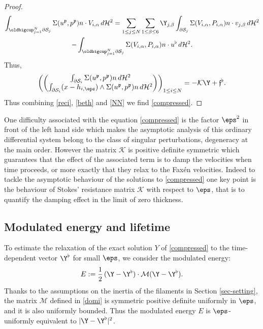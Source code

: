 \begin{proof}
\begin{multline*}
\int_{\oldbigcup_{j=1}^N \partial \mathcal S_j }
\Sigma(u^\mathfrak{p}, p^\mathfrak{p}) n \cdot V_{i,\alpha} \, d\mathcal{H}^2=
\sum_{1 \leq j \leq N} \sum_{1\leq \beta \leq 6} \Y_{j,\beta } \int_{\partial \mathcal S_j }
\Sigma(V_{i,\alpha}, P_{i,\alpha}) n \cdot v_{j,\beta} \, d\mathcal{H}^2
\\ 
-\int_{\oldbigcup_{j=1}^N \partial \mathcal S_j } \Sigma(V_{i,\alpha}, P_{i,\alpha}) n \cdot u^\flat \, d\mathcal{H}^2.
\end{multline*}
Thus,
\begin{equation}
\label{reci}
\biggl(\begin{pmatrix}
\int_{\partial \mathcal S_i } \Sigma(u^\mathfrak{p}, p^\mathfrak{p}) n \, d\mathcal{H}^2 \\
\int_{\partial \mathcal S_i} (x - h_{i,\eps}) \wedge \Sigma(u^\mathfrak{p}, p^\mathfrak{p}) n \, d\mathcal{H}^2
\end{pmatrix}\biggr)_{1 \leq i \leq N}
=
- \mathcal K \Y
+ \mathfrak{f}^\flat.
\end{equation}
Thus combining \eqref{reci}, \eqref{beth} and \eqref{NN}
we find \eqref{compressed}.
\end{proof}

One difficulty associated with the equation \eqref{compressed}
is the factor $\eps^2$ in front of the left hand side which makes the asymptotic analysis of this ordinary differential system belong to the class of singular perturbations, \ie degeneracy at the main order.
However the matrix $\mathcal K$ is positive definite symmetric which guarantees that the effect of the associated term is to damp the velocities when time proceeds, or more exactly that they relax to the Faxén velocities.
Indeed to tackle the asymptotic behaviour of the solutions to \eqref{compressed}
one key point is the behaviour of Stokes' resistance matrix $\mathcal K$ with respect to $\eps$, that is to quantify the damping effect in the limit of zero thickness.

\subsection{Modulated energy and lifetime}
\label{section-modu}

To estimate the relaxation of the exact solution $Y$ of \eqref{compressed}
to the time-dependent vector $\Y^\flat$
for small $\eps$, we consider the modulated energy:
\begin{equation}
E := \frac 1 2\, (\Y - \Y^\flat) \cdot \mathcal{M} (\Y - \Y^\flat).
\end{equation}
Thanks to the assumptions on the inertia of the filaments in
Section
\ref{sec-setting}, the matrix $\mathcal{M}$ defined in \eqref{domi} is symmetric positive definite uniformly in $\eps$, and it is also
uniformly bounded. Thus the modulated energy $E$ is $\eps$-uniformly equivalent to $\vert \Y - \Y^\flat \vert^2$.

